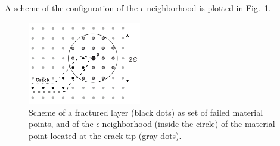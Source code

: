 \documentclass[applsci,journal,article,submit,moreauthors,pdftex]{Definitions/mdpi}
\begin{document}
A scheme of the configuration of the $\epsilon$-neighborhood is plotted in Fig.~\ref{fig3}.
\begin{figure}
\centering
\includegraphics[width=0.44\textwidth]{Figs/eroded_neighbors_2.pdf}
\caption{Scheme of a fractured layer (black dots) as set of failed material points, and of the $\epsilon$-neighborhood (inside the circle) of the material point located at the crack tip (gray dots).}
\label{fig3}
\end{figure}
\end{document}
